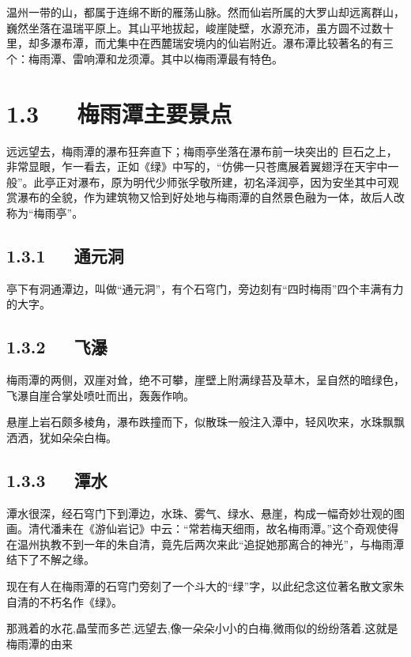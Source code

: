 \documentclass[letterpaper,10pt,english]{sphinxmanual}
\begin{document}
温州一带的山，都属于连绵不断的雁荡山脉。然而仙岩所属的大罗山却远离群山，巍然坐落在温瑞平原上。其山平地拔起，峻崖陡壁，水源充沛，虽方圆不过数十里，却多瀑布潭，而尤集中在西麓瑞安境内的仙岩附近。瀑布潭比较著名的有三个：梅雨潭、雷响潭和龙须潭。其中以梅雨潭最有特色。


\section{1.3   梅雨潭主要景点}
\label{\detokenize{p01_u6563_u6587/_u6731_u81ea_u6e05-_u6885_u96e8_u6f6d_u7684_u7eff:id5}}
远远望去，梅雨潭的瀑布狂奔直下；梅雨亭坐落在瀑布前一块突出的
巨石之上，非常显眼，乍一看去，正如《绿》中写的，“仿佛一只苍鹰展着翼翅浮在天宇中一般”。此亭正对瀑布，原为明代少师张孚敬所建，初名泽润亭，因为安坐其中可观赏瀑布的全貌，作为建筑物又恰到好处地与梅雨潭的自然景色融为一体，故后人改称为“梅雨亭”。


\subsection{1.3.1   通元洞}
\label{\detokenize{p01_u6563_u6587/_u6731_u81ea_u6e05-_u6885_u96e8_u6f6d_u7684_u7eff:id6}}
亭下有洞通潭边，叫做“通元洞”，有个石穹门，旁边刻有“四时梅雨”四个丰满有力的大字。


\subsection{1.3.2   飞瀑}
\label{\detokenize{p01_u6563_u6587/_u6731_u81ea_u6e05-_u6885_u96e8_u6f6d_u7684_u7eff:id7}}
梅雨潭的两侧，双崖对耸，绝不可攀，崖壁上附满绿苔及草木，呈自然的暗绿色，飞瀑自崖合掌处喷吐而出，轰轰作响。

悬崖上岩石颇多棱角，瀑布跌撞而下，似散珠一般注入潭中，轻风吹来，水珠飘飘洒洒，犹如朵朵白梅。


\subsection{1.3.3   潭水}
\label{\detokenize{p01_u6563_u6587/_u6731_u81ea_u6e05-_u6885_u96e8_u6f6d_u7684_u7eff:id8}}
潭水很深，经石穹门下到潭边，水珠、雾气、绿水、悬崖，构成一幅奇妙壮观的图画。清代潘耒在《游仙岩记》中云：“常若梅天细雨，故名梅雨潭。”这个奇观使得在温州执教不到一年的朱自清，竟先后两次来此“追捉她那离合的神光”，与梅雨潭结下了不解之缘。

现在有人在梅雨潭的石穹门旁刻了一个斗大的“绿”字，以此纪念这位著名散文家朱自清的不朽名作《绿》。

那溅着的水花,晶莹而多芒,远望去,像一朵朵小小的白梅,微雨似的纷纷落着.这就是梅雨潭的由来
\end{document}
